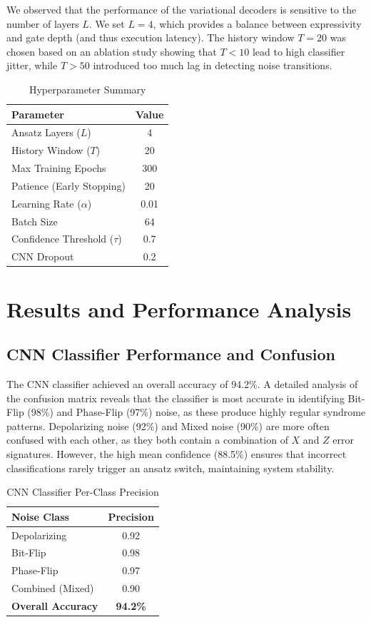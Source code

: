 \documentclass[journal,twocolumn]{IEEEtran}
\begin{document}
We observed that the performance of the variational decoders is sensitive to the number of layers $L$. We set $L=4$, which provides a balance between expressivity and gate depth (and thus execution latency). The history window $T=20$ was chosen based on an ablation study showing that $T < 10$ lead to high classifier jitter, while $T > 50$ introduced too much lag in detecting noise transitions.

\begin{table}[h]
\centering
\caption{Hyperparameter Summary}
\begin{tabular}{lc}
\toprule
Parameter & Value \\
\midrule
Ansatz Layers ($L$) & 4 \\
History Window ($T$) & 20 \\
Max Training Epochs & 300 \\
Patience (Early Stopping) & 20 \\
Learning Rate ($\alpha$) & 0.01 \\
Batch Size & 64 \\
Confidence Threshold ($\tau$) & 0.7 \\
CNN Dropout & 0.2 \\
\bottomrule
\end{tabular}
\end{table}

\section{Results and Performance Analysis}

\subsection{CNN Classifier Performance and Confusion}

The CNN classifier achieved an overall accuracy of 94.2\%. A detailed analysis of the confusion matrix reveals that the classifier is most accurate in identifying Bit-Flip (98\%) and Phase-Flip (97\%) noise, as these produce highly regular syndrome patterns. Depolarizing noise (92\%) and Mixed noise (90\%) are more often confused with each other, as they both contain a combination of $X$ and $Z$ error signatures. However, the high mean confidence (88.5\%) ensures that incorrect classifications rarely trigger an ansatz switch, maintaining system stability.

\begin{table}[h]
\centering
\caption{CNN Classifier Per-Class Precision}
\begin{tabular}{lc}
\toprule
Noise Class & Precision \\
\midrule
Depolarizing & 0.92 \\
Bit-Flip & 0.98 \\
Phase-Flip & 0.97 \\
Combined (Mixed) & 0.90 \\
\midrule
\textbf{Overall Accuracy} & \textbf{94.2\%} \\
\bottomrule
\end{tabular}
\end{table}
\end{document}
